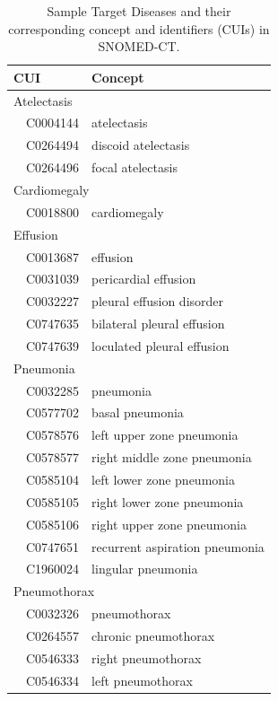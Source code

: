 \documentclass[10pt,twocolumn,letterpaper]{article}
\begin{document}
\begin{table}[b]
	\begin{center}
		\begin{tabular}{ll@{\hspace{4em}}l}
			\hline
			\multicolumn{2}{l}{CUI} & Concept\\\hline\hline
			\multicolumn{3}{l}{Atelectasis} \\
			& C0004144 & atelectasis\\
			& C0264494 & discoid atelectasis\\
			& C0264496 & focal atelectasis\\
			\multicolumn{3}{l}{Cardiomegaly}\\
			& C0018800 & cardiomegaly\\
			\multicolumn{3}{l}{Effusion}\\
			& C0013687 & effusion\\
			& C0031039 & pericardial effusion\\
			& C0032227 & pleural effusion disorder\\
			& C0747635 & bilateral pleural effusion\\
			& C0747639 & loculated pleural effusion\\
			\multicolumn{3}{l}{Pneumonia}\\
			& C0032285 & pneumonia\\
			& C0577702 & basal pneumonia\\
			& C0578576 & left upper zone pneumonia\\
			& C0578577 & right middle zone pneumonia\\
			& C0585104 & left lower zone pneumonia\\
			& C0585105 & right lower zone pneumonia\\
			& C0585106 & right upper zone pneumonia\\
			& C0747651 & recurrent aspiration pneumonia\\
			& C1960024 & lingular pneumonia\\
			\multicolumn{3}{l}{Pneumothorax}\\
			& C0032326 & pneumothorax\\
			& C0264557 & chronic pneumothorax\\
			& C0546333 & right pneumothorax\\
			& C0546334 & left pneumothorax\\
			\hline
		\end{tabular}
	\end{center}
	\caption{Sample Target Diseases and their corresponding concept and identifiers (CUIs) in SNOMED-CT.}
	\label{tab:cuis}
\end{table}
\end{document}
